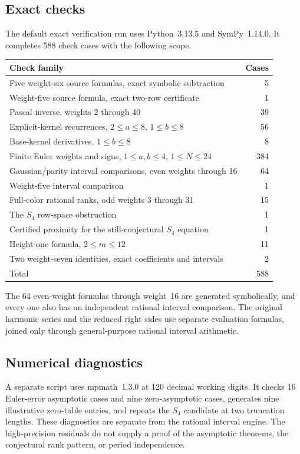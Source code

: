 \documentclass[11pt,a4paper]{article}
\numberwithin{equation}{section}
\theoremstyle{definition}
\theoremstyle{remark}
\begin{document}
\subsection{Exact checks}
The default exact verification run uses Python~3.13.5 and SymPy~1.14.0. It completes 588 check cases with the following scope.
\begin{center}
\small
\begin{tabular}{@{}p{.74\linewidth}r@{}}
\toprule
Check family & Cases\\
\midrule
Five weight-six source formulas, exact symbolic subtraction &5\\
Weight-five source formula, exact two-row certificate &1\\
Pascal inverse, weights 2 through 40 &39\\
Explicit-kernel recurrences, $2\le a\le8$, $1\le b\le8$ &56\\
Base-kernel derivatives, $1\le b\le8$ &8\\
Finite Euler weights and signs, $1\le a,b\le4$, $1\le N\le24$ &384\\
Gaussian/parity interval comparisons, even weights through 16 &64\\
Weight-five interval comparison &1\\
Full-color rational ranks, odd weights 3 through 31 &15\\
The $S_4$ row-space obstruction &1\\
Certified proximity for the still-conjectural $S_4$ equation &1\\
Height-one formula, $2\le m\le12$ &11\\
Two weight-seven identities, exact coefficients and intervals &2\\
\midrule
Total &588\\
\bottomrule
\end{tabular}
\end{center}
The 64 even-weight formulas through weight~16 are generated symbolically, and every one also has an independent rational interval comparison. The original harmonic series and the reduced right sides use separate evaluation formulas, joined only through general-purpose rational interval arithmetic.

\subsection{Numerical diagnostics}
A separate script uses mpmath~1.3.0 at 120 decimal working digits. It checks 16 Euler-error asymptotic cases and nine zero-asymptotic cases, generates nine illustrative zero-table entries, and repeats the $S_4$ candidate at two truncation lengths. These diagnostics are separate from the rational interval engine. The high-precision residuals do not supply a proof of the asymptotic theorems, the conjectural rank pattern, or period independence.
\end{document}
